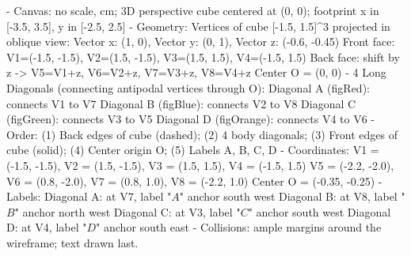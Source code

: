 \begin{content}

\begin{hidden}
- Canvas: no scale, cm; 3D perspective cube centered at (0, 0); footprint x in [-3.5, 3.5], y in [-2.5, 2.5]
- Geometry:
  Vertices of cube [-1.5, 1.5]^3 projected in oblique view:
  Vector x: (1, 0), Vector y: (0, 1), Vector z: (-0.6, -0.45)
  Front face: V1=(-1.5, -1.5), V2=(1.5, -1.5), V3=(1.5, 1.5), V4=(-1.5, 1.5)
  Back face: shift by z -> V5=V1+z, V6=V2+z, V7=V3+z, V8=V4+z
  Center O = (0, 0)
- 4 Long Diagonals (connecting antipodal vertices through O):
  Diagonal A (figRed): connects V1 to V7
  Diagonal B (figBlue): connects V2 to V8
  Diagonal C (figGreen): connects V3 to V5
  Diagonal D (figOrange): connects V4 to V6
- Order: (1) Back edges of cube (dashed); (2) 4 body diagonals; (3) Front edges of cube (solid); (4) Center origin O; (5) Labels A, B, C, D
- Coordinates:
  V1 = (-1.5, -1.5), V2 = (1.5, -1.5), V3 = (1.5, 1.5), V4 = (-1.5, 1.5)
  V5 = (-2.2, -2.0), V6 = (0.8, -2.0), V7 = (0.8, 1.0), V8 = (-2.2, 1.0)
  Center O = (-0.35, -0.25)
- Labels:
  Diagonal A: at V7, label "$A$" anchor south west
  Diagonal B: at V8, label "$B$" anchor north west
  Diagonal C: at V3, label "$C$" anchor south west
  Diagonal D: at V4, label "$D$" anchor south east
- Collisions: ample margins around the wireframe; text drawn last.
\end{hidden}
\begin{center}
\end{center}
\end{content}
